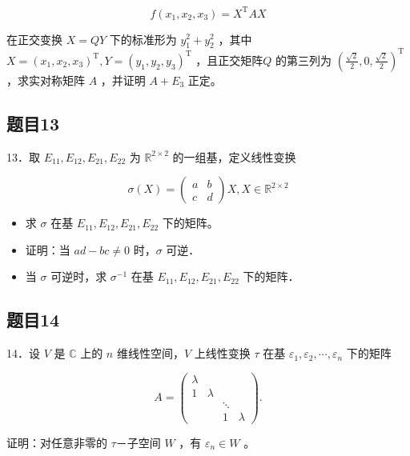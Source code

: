 \documentclass{article}
\begin{document}
\[
f\left(x_{1}, x_{2}, x_{3}\right)=X^{\mathrm{T}} A X
\]

在正交变换 \(X=Q Y\) 下的标准形为 \(y_{1}^{2}+y_{2}^{2}\) ，其中 \(X=\left(x_{1}, x_{2}, x_{3}\right)^{\mathrm{T}}, Y=\left(y_{1}, y_{2}, y_{3}\right)^{\mathrm{T}}\) ，且正交矩阵\(Q\) 的第三列为 \(\left(\frac{\sqrt{2}}{2}, 0, \frac{\sqrt{2}}{2}\right)^{\mathrm{T}}\) ，求实对称矩阵 \(A\) ，并证明 \(A+E_{3}\) 正定。

\subsection{题目13}
13．取 \(E_{11}, E_{12}, E_{21}, E_{22}\) 为 \(\mathbb{R}^{2 \times 2}\) 的一组基，定义线性变换

\[
\sigma(X)=\left(\begin{array}{ll}
a & b \\
c & d
\end{array}\right) X, X \in \mathbb{R}^{2 \times 2}
\]

\begin{itemize}
  \item[（1）] 求 \(\sigma\) 在基 \(E_{11}, E_{12}, E_{21}, E_{22}\) 下的矩阵。
  \item[（2）] 证明：当 \(a d-b c \neq 0\) 时，\(\sigma\) 可逆．
  \item[（3）] 当 \(\sigma\) 可逆时，求 \(\sigma^{-1}\) 在基 \(E_{11}, E_{12}, E_{21}, E_{22}\) 下的矩阵．
\end{itemize}

\subsection{题目14}
14．设 \(V\) 是 \(\mathbb{C}\) 上的 \(n\) 维线性空间，\(V\) 上线性变换 \(\tau\) 在基 \(\varepsilon_{1}, \varepsilon_{2}, \cdots, \varepsilon_{n}\) 下的矩阵

\[
A=\left(\begin{array}{llll}
\lambda & & & \\
1 & \lambda & & \\
& & \ddots & \\
& & 1 & \lambda
\end{array}\right) .
\]

证明：对任意非零的 \(\tau\)－子空间 \(W\) ，有 \(\varepsilon_{n} \in W\) 。
\end{document}
